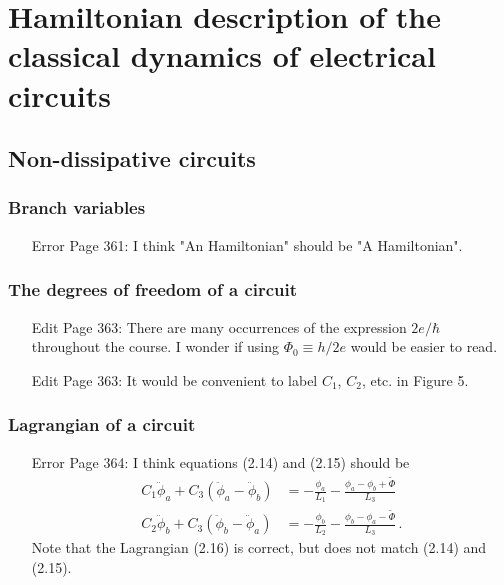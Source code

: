 \section{Hamiltonian description of the classical dynamics of electrical circuits}

\subsection{Non-dissipative circuits}

\subsubsection{Branch variables}

\begin{itemize}

\item[Error] Page 361: I think "An Hamiltonian" should be "A Hamiltonian".

\end{itemize}

\subsubsection{The degrees of freedom of a circuit}

\begin{itemize}

\item[Edit] Page 363: There are many occurrences of the expression $2e / \hbar$ throughout the course. I wonder if using $\Phi_0 \equiv h / 2e$ would be easier to read.

\item[Edit] Page 363: It would be convenient to label $C_1$, $C_2$, etc. in Figure 5.

\end{itemize}

\subsubsection{Lagrangian of a circuit}

\begin{itemize}

\item[Error] Page 364: I think equations (2.14) and (2.15) should be
\begin{align}
C_1 \ddot{\phi}_a + C_3 ( \ddot{\phi}_a - \ddot{\phi}_b) &= - \frac{\phi_a}{L_1} - \frac{\phi_a - \phi_b + \tilde{\Phi}}{L_3} \nonumber \\
C_2 \ddot{\phi}_b + C_3 ( \ddot{\phi}_b - \ddot{\phi}_a) &= - \frac{\phi_b}{L_2} - \frac{\phi_b - \phi_a - \tilde{\Phi}}{L_3} \nonumber \, .
\end{align}
Note that the Lagrangian (2.16) is correct, but does not match (2.14) and (2.15).

\end{itemize}

